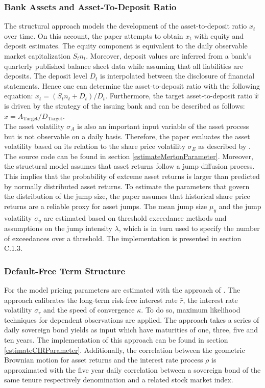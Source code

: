 \subsubsection*{Bank Assets and Asset-To-Deposit Ratio}
The structural approach models the development of the asset-to-deposit ratio $x_t$ over time. On this account, the paper attempts to obtain $x_t$ with equity and deposit estimates. The equity component is equivalent to the daily observable market capitalization $S_t n_t$. Moreover, deposit values are inferred from a bank's quarterly published balance sheet data while assuming that all liabilities are deposits. The deposit level $D_t$ is interpolated between the disclosure of financial statements. \citep{wilkens2014contingent} Hence one can determine the asset-to-deposit ratio with the following equation: $x_t = (S_t n_t + D_t)/D_t$. Furthermore, the target asset-to-deposit ratio $\hat{x}$ is driven by the strategy of the issuing bank and can be described as follows: $\hat{x} = A_\text{Target}/D_\text{Target}$.\\

The asset volatility $\sigma_A$ is also an important input variable of the asset process but is not observable on a daily basis. Therefore, the paper evaluates the asset volatility based on its relation to the share price volatility $\sigma_E$ as described by \citet{merton1974pricing}. The source code can be found in section \ref{estimateMertonParameter}. Moreover, the structural model assumes that asset returns follow a jump-diffusion process. This implies that the probability of extreme asset returns is larger than predicted by normally distributed asset returns. To estimate the parameters that govern the distribution of the jump size, the paper assumes that historical share price returns are a reliable proxy for asset jumps. The mean jump size $\mu_y$ and the jump volatility $\sigma_y$ are estimated based on threshold exceedance methods and assumptions on the jump intensity $\lambda$, which is in turn used to specify the number of exceedances over a threshold. \citep{longin2001extreme} The implementation is presented in section C.1.3.

\subsubsection*{Default-Free Term Structure}
For the \citet{cox1985theory} model pricing parameters are estimated with the approach of \citet{remillard2013statistical}. The approach calibrates the long-term risk-free interest rate $\bar{r}$, the interest rate volatility $\sigma_r$ and the speed of convergence $\kappa$. To do so, maximum likelihood techniques for dependent observations are applied. The approach takes a series of daily sovereign bond yields as input which have maturities of one, three, five and ten years. The implementation of this approach can be found in section \ref{estimateCIRParameter}. Additionally, the correlation between the geometric Brownian motion for asset returns and the interest rate process $\rho$ is approximated with the five year daily correlation between a sovereign bond of the same tenure respectively denomination and a related stock market index.

